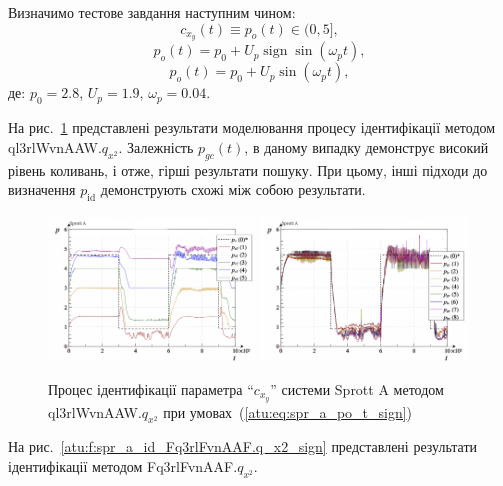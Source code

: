 \documentclass[a4paper,13pt]{atuaref}
\DeclareMathOperator*{\sign}{sign}
\begin{document}
Визначимо тестове завдання наступним чином:
\[
  c_{x_y}(t) \equiv p_o(t) \in (0, 5],
\]
%
\begin{equation}
  p_o(t) = p_0 +  U_{p} \sign \sin( \omega_{p} t ),
  \label{atu:eq:spr_a_po_t_sign}
\end{equation}
%
%
\begin{equation}
  p_o(t) = p_0 +  U_{p} \sin( \omega_{p} t ),
  \label{atu:eq:spr_a_po_t_sin}
\end{equation}
%
де:
$p_0 = 2.8$, $U_p=1.9$, $\omega_p=0.04$.

На рис.~\ref{atu:f:spr_a_id_ql3rlWvnAAW.q_x2_sign}
представлені результати моделювання процесу ідентифікації методом ql3rlWvnAAW.$q_{x^2} $.
Залежність $ p_{gc} (t) $, в даному випадку демонструє високий
рівень коливань, і отже, гірші результати пошуку. При цьому, інші підходи до
визначення $ p_\mathrm{id} $ демонструють схожі між собою результати.

\begin{figure}[ht!]
  \centerline{
    \includegraphics[width=0.49\textwidth]{p5/p/cha/spr_a/ql3rlWvnAAW_x2/sprott_a_id-p_t_pi_ql3rlWvnAAW_sign_xl.png}
    \hfill
    \includegraphics[width=0.49\textwidth]{p5/p/cha/spr_a/ql3rlWvnAAW_x2/sprott_a_id-p_t_p_ql3rlWvnAAW_sign_xl.png}
  }
  \caption{Процес ідентифікації параметра ``$c_{x_y}$'' системи Sprott A методом ql3rlWvnAAW.$q_{x^2}$ при умовах~(\ref{atu:eq:spr_a_po_t_sign})}
  \label{atu:f:spr_a_id_ql3rlWvnAAW.q_x2_sign}
\end{figure}

На рис.~\ref{atu:f:spr_a_id_Fq3rlFvnAAF.q_x2_sign}
представлені результати ідентифікації методом
Fq3rlFvnAAF.$q_{x^2}$.
\end{document}
